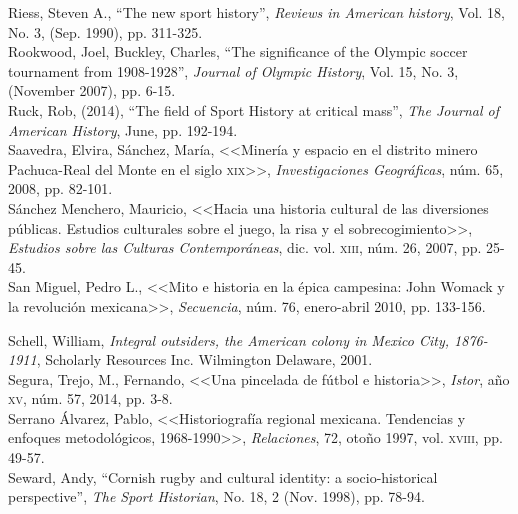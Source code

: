 \documentclass[11pt,a5paper,twoside]{book} %
\begin{document}
\begin{hangparas}{1cm}{1}
\noindent Riess, Steven A., “The new sport history”, \emph{Reviews in American history}, Vol. 18, No. 3, (Sep. 1990), pp. 311-325. \\

\noindent Rookwood, Joel, Buckley, Charles, “The significance of the Olympic soccer tournament
from 1908-1928”, \emph{Journal of Olympic History}, Vol. 15, No. 3, (November 2007), pp. 6-15. \\

\noindent Ruck, Rob, (2014), “The field of Sport History at critical mass”, \emph{The Journal of American History}, June, pp. 192-194. \\

\noindent Saavedra, Elvira, Sánchez, María, <<Minería y espacio en el distrito minero Pachuca-Real del
Monte en el siglo \textsc{xix}>>, \emph{Investigaciones Geográficas}, núm. 65, 2008, pp. 82-101. \\

\noindent Sánchez Menchero, Mauricio, <<Hacia una historia cultural de las diversiones públicas. Estudios culturales sobre el juego, la risa y el sobrecogimiento>>, \emph{Estudios sobre las Culturas Contemporáneas}, dic. vol. \textsc{xiii}, núm. 26, 2007, pp. 25-45. \\

\noindent San Miguel, Pedro L., <<Mito e historia en la épica campesina: John Womack y la revolución mexicana>>, \emph{Secuencia}, núm. 76, enero-abril 2010, pp. 133-156. \\

\pagebreak

\noindent Schell, William, \emph{Integral outsiders, the American colony in Mexico City, 1876-1911}, Scholarly Resources Inc. Wilmington Delaware, 2001. \\

\noindent Segura, Trejo, M., Fernando, <<Una pincelada de fútbol e historia>>, \emph{Istor}, año \textsc{xv}, núm. 57, 2014, pp. 3-8. \\

\noindent Serrano Álvarez, Pablo, <<Historiografía regional mexicana. Tendencias y enfoques metodológicos, 1968-1990>>, \emph{Relaciones}, 72, otoño 1997, vol. \textsc{xviii}, pp. 49-57. \\

\noindent Seward, Andy, “Cornish rugby and cultural identity: a socio-historical perspective”, \emph{The Sport Historian}, No. 18, 2 (Nov. 1998), pp. 78-94. \\


\end{hangparas}
\end{document}
